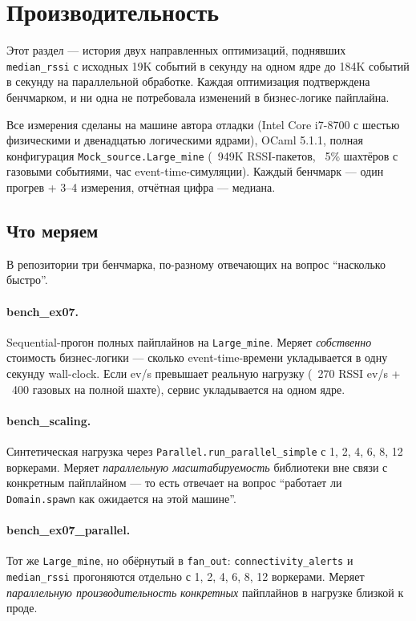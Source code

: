 
\section{Производительность}\label{sec:performance}

Этот раздел --- история двух направленных оптимизаций, поднявших
\texttt{median\_rssi} с исходных 19K событий в секунду на одном
ядре до 184K событий в секунду на параллельной обработке. Каждая
оптимизация подтверждена бенчмарком, и ни одна не потребовала
изменений в бизнес-логике пайплайна.

Все измерения сделаны на машине автора отладки (Intel Core i7-8700 с
шестью физическими и двенадцатью логическими ядрами), OCaml 5.1.1,
полная конфигурация \texttt{Mock\_source.Large\_mine} (~949K
RSSI-пакетов, ~5\% шахтёров с газовыми событиями, час
event-time-симуляции). Каждый бенчмарк --- один прогрев + 3--4
измерения, отчётная цифра --- медиана.

\subsection{Что меряем}

В репозитории три бенчмарка, по-разному отвечающих на вопрос
``насколько быстро''.

\paragraph{bench\_ex07.} Sequential-прогон полных пайплайнов на
\texttt{Large\_mine}. Меряет \emph{собственно} стоимость
бизнес-логики --- сколько event-time-времени укладывается в одну
секунду wall-clock. Если ev/s превышает реальную нагрузку (~270 RSSI
ev/s + ~400 газовых на полной шахте), сервис укладывается на одном
ядре.

\paragraph{bench\_scaling.} Синтетическая нагрузка через
\texttt{Parallel.run\_parallel\_simple} с 1, 2, 4, 6, 8, 12
воркерами. Меряет \emph{параллельную масштабируемость} библиотеки
вне связи с конкретным пайплайном --- то есть отвечает на вопрос
``работает ли \texttt{Domain.spawn} как ожидается на этой машине''.

\paragraph{bench\_ex07\_parallel.} Тот же \texttt{Large\_mine}, но
обёрнутый в \texttt{fan\_out}: \texttt{connectivity\_alerts} и
\texttt{median\_rssi} прогоняются отдельно с 1, 2, 4, 6, 8, 12
воркерами. Меряет \emph{параллельную производительность}
\emph{конкретных} пайплайнов в нагрузке близкой к проде.

